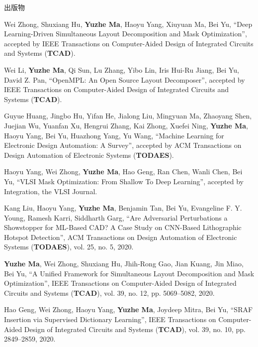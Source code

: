 \begin{rSection}{出版物}
\begin{description}[font=\normalfont]
\item[{[J12]}] {
    Wei Zhong, Shuxiang Hu, \textbf{Yuzhe Ma}, Haoyu Yang, Xiuyuan Ma, Bei Yu,
    ``Deep Learning-Driven Simultaneous Layout Decomposition and Mask Optimization'',
    accepted by IEEE Transactions on Computer-Aided Design of Integrated Circuits and Systems (\textbf{TCAD}).
}

\item[{[J11]}]{
    Wei Li, \textbf{Yuzhe Ma}, Qi Sun, Lu Zhang, Yibo Lin, Iris Hui-Ru Jiang, Bei Yu, David Z. Pan,
    ``OpenMPL: An Open Source Layout Decomposer'',
    accepted by IEEE Transactions on Computer-Aided Design of Integrated Circuits and Systems (\textbf{TCAD}).
}

\item[{[J10]}] {
    Guyue Huang, Jingbo Hu, Yifan He, Jialong Liu, Mingyuan Ma, Zhaoyang Shen, Juejian Wu, Yuanfan Xu, Hengrui Zhang, Kai Zhong, Xuefei Ning, \textbf{Yuzhe Ma}, Haoyu Yang, Bei Yu, Huazhong Yang, Yu Wang,
    ``Machine Learning for Electronic Design Automation: A Survey'',
    accepted by ACM Transactions on Design Automation of Electronic Systems (\textbf{TODAES}).
}

\item[{[J9]}]{
    Haoyu Yang, Wei Zhong, \textbf{Yuzhe Ma}, Hao Geng, Ran Chen, Wanli Chen, Bei Yu,
    ``VLSI Mask Optimization: From Shallow To Deep Learning'',
    accepted by Integration, the VLSI Journal.
}

\item[{[J8]}]{
    Kang Liu, Haoyu Yang, \textbf{Yuzhe Ma}, Benjamin Tan, Bei Yu, Evangeline F. Y. Young, Ramesh Karri, Siddharth Garg,
    ``Are Adversarial Perturbations a Showstopper for ML-Based CAD? A Case Study on CNN-Based Lithographic Hotspot Detection'',
    ACM Transactions on Design Automation of Electronic Systems (\textbf{TODAES}), vol. 25, no. 5, 2020.
}


\item[{[J7]}]{
    \textbf{Yuzhe Ma}, Wei Zhong, Shuxiang Hu, Jhih-Rong Gao, Jian Kuang, Jin Miao, Bei Yu,
    ``A Unified Framework for Simultaneous Layout Decomposition and Mask Optimization'',
    IEEE Transactions on Computer-Aided Design of Integrated Circuits and Systems (\textbf{TCAD}), vol. 39, no. 12, pp. 5069--5082, 2020.
}

\item[{[J6]}]{
    Hao Geng, Wei Zhong, Haoyu Yang, \textbf{Yuzhe Ma}, Joydeep Mitra, Bei Yu,
    ``SRAF Insertion via Supervised Dictionary Learning'',
    IEEE Transactions on Computer-Aided Design of Integrated Circuits and Systems (\textbf{TCAD}), vol. 39, no. 10, pp. 2849--2859, 2020.
}


\end{description}
\end{rSection}
